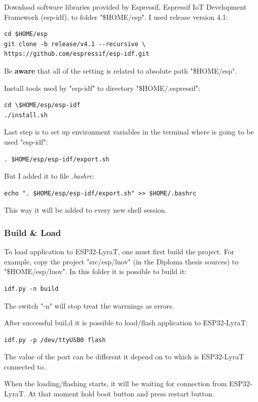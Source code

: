 \documentclass[thesis=M,english]{FITthesis}[2019/12/23]
\begin{document}
\bigskip
\noindent
Download software libraries provided by Espressif, Espressif IoT Development Framework (esp-idf), to folder "\$HOME/esp". I used release version 4.1:
\begin{lstlisting}[frame=single]
cd $HOME/esp
git clone -b release/v4.1 --recursive \
https://github.com/espressif/esp-idf.git
\end{lstlisting}
Be \textbf{aware} that all of the setting is related to absolute path "\$HOME/esp". 

\bigskip
\noindent
Install tools used by "esp-idf" to directory "\$HOME/.espressif":
\begin{lstlisting}[frame=single]
cd \$HOME/esp/esp-idf
./install.sh
\end{lstlisting}

\bigskip
\noindent
Last step is to set up environment variables in the terminal where is going to be used "esp-idf":
\begin{lstlisting}[frame=single]
. $HOME/esp/esp-idf/export.sh
\end{lstlisting}
But I added it to file \textit{.bashrc}:
\begin{lstlisting}[frame=single]
echo ". $HOME/esp/esp-idf/export.sh" >> $HOME/.bashrc
\end{lstlisting}
This way it will be added to every new shell session.

\subsubsection{Build \& Load}
To load application to ESP32-LyraT, one must first build the project. For example, copy the project "src/esp/luov" (in the Diploma thesis sources) to "\$HOME/esp/luov". In this folder it is possible to build it:
\begin{lstlisting}[frame=single]
idf.py -n build
\end{lstlisting}
The switch "-n" will stop treat the warrnings as errors.

\bigskip
\noindent
After successful buil,d it is possible to load/flash application to ESP32-LyraT:
\begin{lstlisting}[frame=single]
idf.py -p /dev/ttyUSB0 flash
\end{lstlisting}
The value of the port can be different it depend on to which is ESP32-LyraT connected to.

\bigskip
\noindent
When the loading/flashing starts, it will be waiting for connection from ESP32-LyraT. At that moment hold boot button and press restart button.
\end{document}
